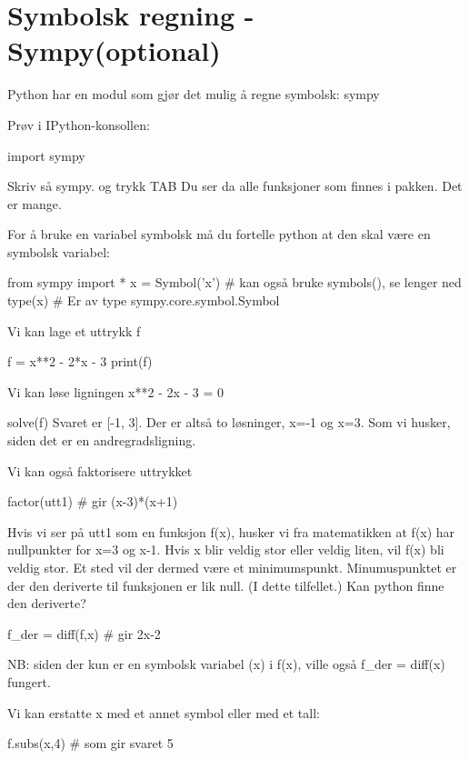 \section{Symbolsk regning - Sympy(optional)}

Python har en modul som gjør det mulig å regne symbolsk: sympy

Prøv i IPython-konsollen:
\begin{usncodebox}
import sympy
\end{usncodebox}

Skriv så sympy. og trykk TAB Du ser da alle funksjoner som finnes i pakken. Det er mange.

For å bruke en variabel symbolsk må du fortelle python at den skal være en symbolsk variabel:

\begin{usncodebox}
from sympy import *
x = Symbol('x')   # kan også bruke symbols(), se lenger ned 
type(x)           # Er av type sympy.core.symbol.Symbol
\end{usncodebox}

Vi kan lage et uttrykk f
\begin{usncodebox}
f = x**2 - 2*x - 3 
print(f)
\end{usncodebox}

Vi kan løse ligningen x**2 - 2x - 3 = 0
\begin{usncodebox}
solve(f)
Svaret er [-1, 3]. Der er altså to løsninger, x=-1 og x=3.
Som vi husker, siden det er en andregradsligning.
\end{usncodebox}

Vi kan også faktorisere uttrykket
\begin{usncodebox}
factor(utt1)    # gir (x-3)*(x+1)
\end{usncodebox}

Hvis vi ser på utt1 som en funksjon f(x), husker vi fra matematikken at f(x) har nullpunkter for x=3 og x-1. Hvis x blir veldig stor eller veldig liten, vil f(x) bli veldig stor. Et sted vil der dermed være et minimumspunkt. Minumuspunktet er der den deriverte til funksjonen er lik null. (I dette tilfellet.) Kan python finne den deriverte?
\begin{usncodebox}
f_der = diff(f,x)    # gir 2x-2
\end{usncodebox}
NB: siden der kun er en symbolsk variabel (x) i f(x), ville også f\_{}der = diff(x) fungert. 

Vi kan erstatte x med et annet symbol eller med et tall:
\begin{usncodebox}
f.subs(x,4)    # som gir svaret 5
\end{usncodebox}

